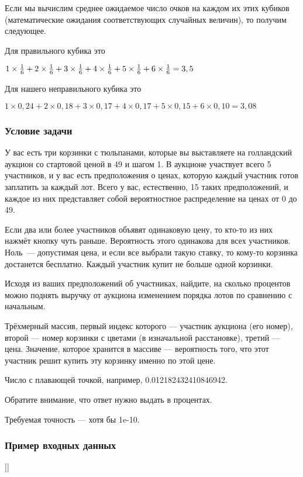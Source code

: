 Если мы вычислим среднее ожидаемое число очков на каждом их этих кубиков (математические ожидания соответствующих случайных величин), то получим следующее.

Для правильного кубика это 

$1 \times { 1 \over 6 } + 2 \times { 1 \over 6 } + 3 \times { 1 \over 6 } + 4 \times { 1 \over 6 }+5  \times { 1 \over 6 } +6 \times { 1 \over 6 } = 3,5$ 

Для нашего неправильного кубика это 

$1 \times 0,24 + 2 \times 0,18 + 3 \times 0,17 + 4 \times 0,17 + 5\times 0,15 + 6\times 0,10 = 3,08$  

\subsubsection*{Условие задачи}

У вас есть три корзинки с тюльпанами, которые вы выставляете на голландский аукцион со стартовой ценой в 49 и шагом 1.
В аукционе участвует всего 5 участников, и у вас есть предположения о ценах, которую каждый участник готов заплатить за каждый лот.
Всего у вас, естественно, 15 таких предположений, и каждое из них представляет собой вероятностное распределение на ценах от 0 до 49.

Если два или более участников объявят одинаковую цену, то кто-то из них нажмёт кнопку чуть раньше.
Вероятность этого одинакова для всех участников.
Ноль~— допустимая цена, и если все выбрали такую ставку, то кому-то корзинка достанется бесплатно.
Каждый участник купит не больше одной корзинки.

Исходя из ваших предположений об участниках, найдите, на сколько процентов можно поднять выручку от аукциона изменением порядка лотов по сравнению с начальным.


Трёхмерный массив, первый индекс которого — участник аукциона (его номер), второй — номер корзинки с цветами (в изначальной расстановке), третий — цена. Значение, которое хранится в массиве — вероятность того, что этот участник решит купить эту корзинку именно по этой цене.

\outputfmtSection

Число с плавающей точкой, например, 0.012182432410846942.

Обратите внимание, что ответ нужно выдать в процентах.

Требуемая точность — хотя бы 1e-10.

\subsubsection*{Пример входных данных}

\noindent[[[0.0, 0.0, 0.00037280466184606246, 0.0006687013716653295, 0.0014910532789078324, \linebreak 0.0022033598533922837, 0.0033672906128430487, 0.004827078289717003, \\
0.006056792296892899, 0.007235026230088179, 0.00894220596189969, $\cdots$ ]]]

